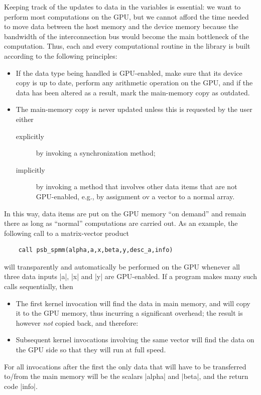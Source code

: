Keeping track of the updates to data in the variables  is essential: we want
to perform most  computations on the GPU, but we cannot afford the time
needed to move data between the host  memory and the device memory
because the bandwidth of the interconnection bus would become the main
bottleneck of the computation. Thus, each and every computational
routine in the library is built according to the following principles: 
\begin{itemize}
\item If the data type being handled is {GPU}-enabled, make sure that
  its device copy is up to date, perform any arithmetic operation on
  the {GPU}, and if the data has been altered as a result, mark
  the main-memory copy as outdated.
\item The main-memory copy is never updated unless this is requested
  by the user either 
\begin{description}
\item[explicitly] by invoking a synchronization method;
\item[implicitly] by invoking a method that involves other data items
  that are not {GPU}-enabled, e.g., by assignment ov a vector to a
  normal array. 
\end{description}
\end{itemize}
In this way, data items are put on the {GPU} memory ``on demand'' and
remain there as long as ``normal'' computations are carried out. 
As an example, the following call to a matrix-vector product
\begin{verbatim}
    call psb_spmm(alpha,a,x,beta,y,desc_a,info)
\end{verbatim}
will transparently and automatically be performed on the {GPU} whenever
all three data inputs \fortinline|a|, \fortinline|x|  and
\fortinline|y| are {GPU}-enabled. If a program makes many such calls
sequentially, then 
\begin{itemize}
\item The first kernel invocation will find the data in main memory,
  and will copy it to the {GPU} memory, thus incurring a significant
  overhead; the result is however \emph{not} copied back, and
  therefore:
\item Subsequent kernel invocations involving the same vector will
  find the data on the {GPU} side so that they will run at full
  speed.
\end{itemize}
For all invocations after the first the only data that will have to be
transferred to/from the main memory will be the scalars \fortinline|alpha|
and \fortinline|beta|, and the return code \fortinline|info|.  

